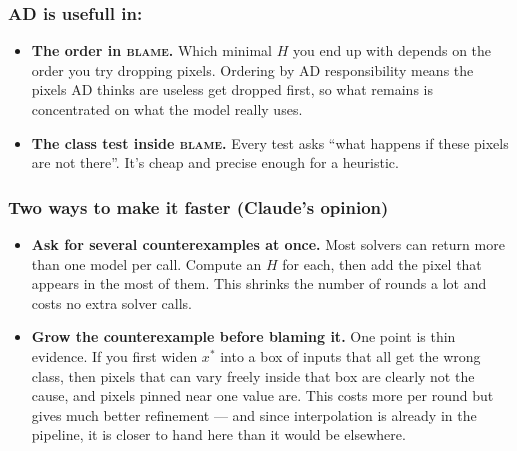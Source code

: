 \documentclass[11pt,a4paper]{article}
\newcommand{\convad}{\textsc{ConvAD}}
\newcommand{\ad}{\textsc{AD}}
\begin{document}

\subsubsection*{ \ad{} is usefull in:}


\begin{itemize}[leftmargin=1.2em]
\item \textbf{The order in \textsc{blame}.} Which minimal $H$ you end up with
depends on the order you try dropping pixels. Ordering by \ad{} responsibility
means the pixels \ad{} thinks are useless get dropped first, so what remains is
concentrated on what the model really uses.

\item \textbf{The class test inside \textsc{blame}.} Every test asks ``what
happens if these pixels are not there''. It's cheap and precise enough for a heuristic. 
\end{itemize}

\subsubsection*{Two ways to make it faster (Claude's opinion)}

\begin{itemize}[leftmargin=1.2em]
\item \textbf{Ask for several counterexamples at once.} Most solvers can return
more than one model per call. Compute an $H$ for each, then add the pixel that
appears in the most of them. This shrinks the number of rounds a lot and costs
no extra solver calls.

\item \textbf{Grow the counterexample before blaming it.} One point is thin
evidence. If you first widen $x^\ast$ into a box of inputs that all get the
wrong class, then pixels that can vary freely inside that box are clearly not
the cause, and pixels pinned near one value are. This costs more per round but
gives much better refinement --- and since interpolation is already in the
pipeline, it is closer to hand here than it would be elsewhere.
\end{itemize}
\end{document}

